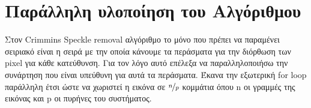 \documentclass[12pt]{article}
\begin{document}
\newpage

\section{Παράλληλη υλοποίηση του Αλγόριθμου}

Στον Crimmins Speckle removal αλγόριθμο το μόνο που πρέπει να παραμένει σειριακό είναι η σειρά με την οποία κάνουμε τα περάσματα για την διόρθωση των pixel για κάθε κατεύθυνση. Για τον λόγο αυτό επέλεξα να παραλληλοποιήσω την συνάρτηση που είναι υπεύθυνη για αυτά τα περάσματα. Έκανα την εξωτερική for loop παράλληλη έτσι ώστε να χωριστεί η εικόνα σε $\nicefrac{\Large n}{\Large p}$ κομμάτια όπου n οι γραμμές της εικόνας και p οι πυρήνες του συστήματος.
\end{document}
